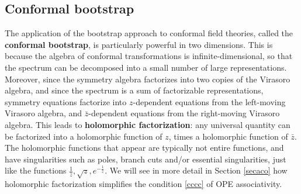 \documentclass[12pt, a4paper, notitlepage, twoside]{report}
\numberwithin{equation}{section}
\theoremstyle{break}
\begin{document}
\subsection{Conformal bootstrap}

The application of the bootstrap approach to conformal field theories, called the \textbf{conformal bootstrap}, 
is particularly powerful in two dimensions.
This is because the algebra of conformal transformations is infinite-dimensional, 
so that the spectrum can be decomposed into a small number of large representations.
Moreover, since the symmetry algebra factorizes into two copies of the Virasoro algebra, and since the spectrum is a sum of factorizable representations,
symmetry equations factorize into $z$-dependent equations from the left-moving Virasoro algebra, and $\bar{z}$-dependent equations from the right-moving Virasoro algebra.
This leads to  \textbf{\boldmath holomorphic factorization}:
any universal quantity can be factorized into a holomorphic function of $z$, times a holomorphic function of $\bar z$. The holomorphic functions that appear are typically not entire functions, and have singularities such as poles, branch cuts and/or essential singularities, just like the functions $\frac{1}{z},\sqrt{z}, e^{-\frac{1}{z}}$. 
We will see in more detail in Section \ref{secaco} how holomorphic factorization simplifies the condition \eqref{cccc} of OPE associativity.
\end{document}
